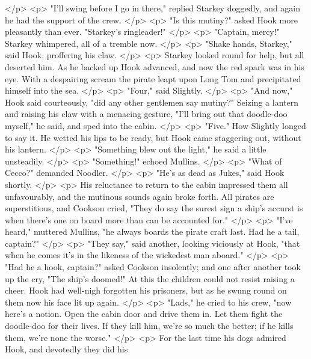    </p>
    <p>
      "I'll swing before I go in there," replied Starkey doggedly, and again he
      had the support of the crew.
    </p>
    <p>
      "Is this mutiny?" asked Hook more pleasantly than ever. "Starkey's
      ringleader!"
    </p>
    <p>
      "Captain, mercy!" Starkey whimpered, all of a tremble now.
    </p>
    <p>
      "Shake hands, Starkey," said Hook, proffering his claw.
    </p>
    <p>
      Starkey looked round for help, but all deserted him. As he backed up Hook
      advanced, and now the red spark was in his eye. With a despairing scream
      the pirate leapt upon Long Tom and precipitated himself into the sea.
    </p>
    <p>
      "Four," said Slightly.
    </p>
    <p>
      "And now," Hook said courteously, "did any other gentlemen say mutiny?"
      Seizing a lantern and raising his claw with a menacing gesture, "I'll
      bring out that doodle-doo myself," he said, and sped into the cabin.
    </p>
    <p>
      "Five." How Slightly longed to say it. He wetted his lips to be ready, but
      Hook came staggering out, without his lantern.
    </p>
    <p>
      "Something blew out the light," he said a little unsteadily.
    </p>
    <p>
      "Something!" echoed Mullins.
    </p>
    <p>
      "What of Cecco?" demanded Noodler.
    </p>
    <p>
      "He's as dead as Jukes," said Hook shortly.
    </p>
    <p>
      His reluctance to return to the cabin impressed them all unfavourably, and
      the mutinous sounds again broke forth. All pirates are superstitious, and
      Cookson cried, "They do say the surest sign a ship's accurst is when
      there's one on board more than can be accounted for."
    </p>
    <p>
      "I've heard," muttered Mullins, "he always boards the pirate craft last.
      Had he a tail, captain?"
    </p>
    <p>
      "They say," said another, looking viciously at Hook, "that when he comes
      it's in the likeness of the wickedest man aboard."
    </p>
    <p>
      "Had he a hook, captain?" asked Cookson insolently; and one after another
      took up the cry, "The ship's doomed!" At this the children could not
      resist raising a cheer. Hook had well-nigh forgotten his prisoners, but as
      he swung round on them now his face lit up again.
    </p>
    <p>
      "Lads," he cried to his crew, "now here's a notion. Open the cabin door
      and drive them in. Let them fight the doodle-doo for their lives. If they
      kill him, we're so much the better; if he kills them, we're none the
      worse."
    </p>
    <p>
      For the last time his dogs admired Hook, and devotedly they did his
